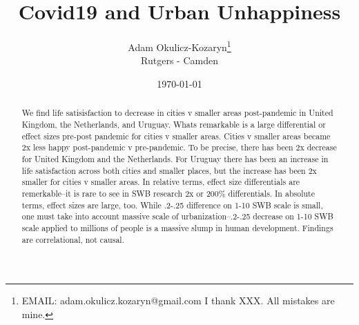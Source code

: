 \documentclass[10pt, letterpaper]{article}
\date{{}\today \hspace{.2in}\xxivtime}
\title{  %
  Covid19 and Urban Unhappiness
}
\author{
Adam Okulicz-Kozaryn\thanks{EMAIL: adam.okulicz.kozaryn@gmail.com
  \hfill I thank XXX.  All mistakes are mine.} \\
{\small Rutgers - Camden  %
}
}
\begin{document}


\maketitle
\vspace{-.4in}
\begin{center}

\end{center}


\begin{abstract}
  \noindent  We find life satisisfaction to
  decrease in cities v smaller areas post-pandemic in United Kingdom, 
 the Netherlands, and Uruguay. 
  Whats remarkable is a large differential or effect sizes pre-post
  pandemic for cities v smaller areas.  Cities  v smaller areas became 2x less happy
 post-pandemic v pre-pandemic. To be precise, there has been 2x decrease for
 United Kingdom and  the Netherlands.  For Uruguay there has been an increase in
 life satisfaction across both cities and smaller places, but the increase has
 been 2x smaller for cities v smaller areas. In relative terms, effect size differentials are remerkable--it is rare to see in SWB research 2x or 200\% differentials. In
 absolute terms, effect sizes are large, too. While .2-.25 difference on 1-10
 SWB scale is small, one must take into account massive scale of
 urbanization--.2-.25 decrease on 1-10 SWB scale applied to millions of people
 is a massive slump in human development. Findings are correlational, not causal. 
\end{abstract}
\vspace{.15in} 
\vspace{.25in} 
\end{document}
